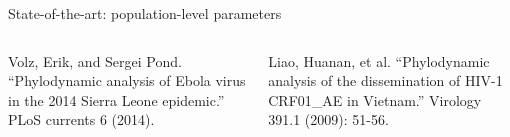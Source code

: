 \documentclass{beamer}
\begin{document}
\begin{frame}{State-of-the-art: population-level parameters}
\begin{columns}
\begin{column}{0.5\textwidth}
        \end{column}
    \end{columns}
    \begin{columns}
        \begin{column}{0.5\textwidth}
            \tiny{Volz, Erik, and Sergei Pond. ``Phylodynamic analysis of Ebola virus in the 2014 Sierra Leone epidemic.'' PLoS currents 6 (2014).}
        \end{column}
        \begin{column}{0.5\textwidth}
            \tiny{Liao, Huanan, et al. ``Phylodynamic analysis of the dissemination of HIV-1 CRF01\_AE in Vietnam.'' Virology 391.1 (2009): 51-56.}
        \end{column}
    \end{columns}
\end{frame}
\end{document}
